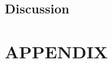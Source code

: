 \documentclass[a4paper, 10pt]{article}
\begin{document}
\subsection{Discussion}

%


\nocite{*}




\clearpage
\section*{APPENDIX}

\begin{lstlisting}[language = C++]

\end{lstlisting}
\end{document}
